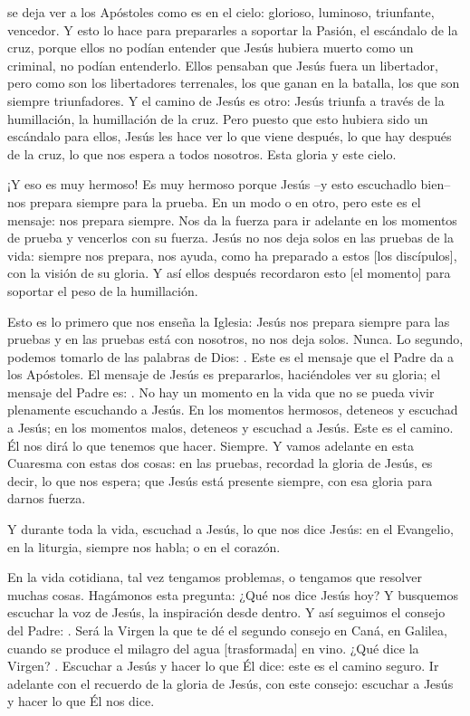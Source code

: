 \begin{body}
 se deja ver a los Apóstoles como es en el cielo: glorioso, luminoso, triunfante, vencedor. Y esto lo hace para prepararles a soportar la Pasión, el escándalo de la cruz, porque ellos no podían entender que Jesús hubiera muerto como un criminal, no podían entenderlo. Ellos pensaban que Jesús fuera un libertador, pero como son los libertadores terrenales, los que ganan en la batalla, los que son siempre triunfadores. Y el camino de Jesús es otro: Jesús triunfa a través de la humillación, la humillación de la cruz. Pero puesto que esto hubiera sido un escándalo para ellos, Jesús les hace ver lo que viene después, lo que hay después de la cruz, lo que nos espera a todos nosotros. Esta gloria y este cielo.

¡Y eso es muy hermoso! Es muy hermoso porque Jesús –y esto escuchadlo bien– nos prepara siempre para la prueba. En un modo o en otro, pero este es el mensaje: nos prepara siempre. Nos da la fuerza para ir adelante en los momentos de prueba y vencerlos con su fuerza. Jesús no nos deja solos en las pruebas de la vida: siempre nos prepara, nos ayuda, como ha preparado a estos [los discípulos], con la visión de su gloria. Y así ellos después recordaron esto [el momento] para soportar el peso de la humillación.

Esto es lo primero que nos enseña la Iglesia: Jesús nos prepara siempre para las pruebas y en las pruebas está con nosotros, no nos deja solos. Nunca. Lo segundo, podemos tomarlo de las palabras de Dios: . Este es el mensaje que el Padre da a los Apóstoles. El mensaje de Jesús es prepararlos, haciéndoles ver su gloria; el mensaje del Padre es: . No hay un momento en la vida que no se pueda vivir plenamente escuchando a Jesús. En los momentos hermosos, deteneos y escuchad a Jesús; en los momentos malos, deteneos y escuchad a Jesús. Este es el camino. Él nos dirá lo que tenemos que hacer. Siempre. Y vamos adelante en esta Cuaresma con estas dos cosas: en las pruebas, recordad la gloria de Jesús, es decir, lo que nos espera; que Jesús está presente siempre, con esa gloria para darnos fuerza.

Y durante toda la vida, escuchad a Jesús, lo que nos dice Jesús: en el Evangelio, en la liturgia, siempre nos habla; o en el corazón.

En la vida cotidiana, tal vez tengamos problemas, o tengamos que resolver muchas cosas. Hagámonos esta pregunta: ¿Qué nos dice Jesús hoy? Y busquemos escuchar la voz de Jesús, la inspiración desde dentro. Y así seguimos el consejo del Padre: . Será la Virgen la que te dé el segundo consejo en Caná, en Galilea, cuando se produce el milagro del agua [trasformada] en vino. ¿Qué dice la Virgen? . Escuchar a Jesús y hacer lo que Él dice: este es el camino seguro. Ir adelante con el recuerdo de la gloria de Jesús, con este consejo: escuchar a Jesús y hacer lo que Él nos dice.
\end{body}

